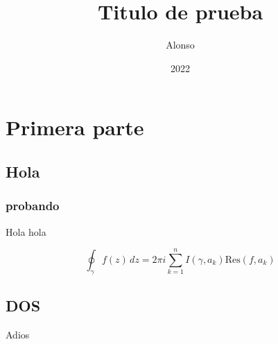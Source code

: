 \documentclass[colorful]{sty/itam-thesis}
\author{Alonso}
\title{Titulo de prueba}
\date{2022}
\begin{document}
\frontmatter
\maketitle
\makefrontmatter
{}
\tableofcontents*

\mainmatter

\part{Primera parte}
\chapter{Hola}

\lipsum[1-10]

\section{probando}
Hola hola

\begin{equation}
	\oint_\gamma f(z) \, dz = 2 \pi i \sum_{k=1}^{n} I(\gamma, a_k) \mathrm{Res}(f, a_k)
\end{equation}

\chapter{DOS}

Adios

\nocite{*}
\printbibliography
\end{document}

